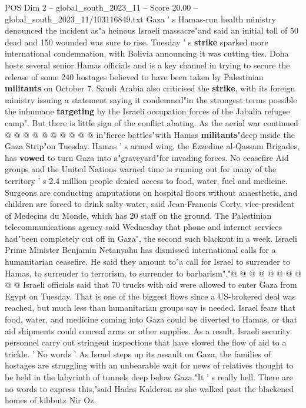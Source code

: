 \begin{textsample}{POS Dim 2 – global\_south\_2023\_11 – Score 20.00 – global\_south\_2023\_11/103116849.txt}
Gaza ' s Hamas-run health ministry denounced the incident as"a heinous Israeli massacre"and said an initial toll of 50 dead and 150 wounded was sure to rise.
Tuesday ' s \textbf{strike} sparked more international condemnation, with Bolivia announcing it was cutting ties.
Doha hosts several senior Hamas officials and is a key channel in trying to secure the release of some 240 hostages believed to have been taken by Palestinian \textbf{militants} on October 7.
Saudi Arabia also criticised the \textbf{strike}, with its foreign ministry issuing a statement saying it condemned"in the strongest terms possible the inhumane \textbf{targeting} by the Israeli occupation forces of the Jabalia refugee camp".
But there is little sign of the conflict abating.
As the aerial war continued @ @ @ @ @ @ @ @ @ @ in"fierce battles"with Hamas \textbf{militants}"deep inside the Gaza Strip"on Tuesday.
Hamas ' s armed wing, the Ezzedine al-Qassam Brigades, has \textbf{vowed} to turn Gaza into a"graveyard"for invading forces.
No ceasefire Aid groups and the United Nations warned time is running out for many of the territory ' s 2.4 million people denied access to food, water, fuel and medicine.
Surgeons are conducting amputations on hospital floors without anaesthetic, and children are forced to drink salty water, said Jean-Francois Corty, vice-president of Medecins du Monde, which has 20 staff on the ground.
The Palestinian telecommunications agency said Wednesday that phone and internet services had"been completely cut off in Gaza", the second such blackout in a week.
Israeli Prime Minister Benjamin Netanyahu has dismissed international calls for a humanitarian ceasefire.
He said they amount to"a call for Israel to surrender to Hamas, to surrender to terrorism, to surrender to barbarism"."@ @ @ @ @ @ @ @ @ @ Israeli officials said that 70 trucks with aid were allowed to enter Gaza from Egypt on Tuesday.
That is one of the biggest flows since a US-brokered deal was reached, but much less than humanitarian groups say is needed.
Israel fears that food, water, and medicine coming into Gaza could be diverted to Hamas, or that aid shipments could conceal arms or other supplies.
As a result, Israeli security personnel carry out stringent inspections that have slowed the flow of aid to a trickle. ' No words ' As Israel steps up its assault on Gaza, the families of hostages are struggling with an unbearable wait for news of relatives thought to be held in the labyrinth of tunnels deep below Gaza."It ' s really hell.
There are no words to express this,"said Hadas Kalderon as she walked past the blackened homes of kibbutz Nir Oz.

\end{textsample}
